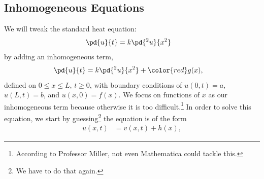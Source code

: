 \documentclass[10pt]{mypackage}
\begin{document}
\subsection{Inhomogeneous Equations}%
We will tweak the standard heat equation:
\begin{align*}
  \pd{u}{t} &= k\pd{^2u}{x^2}
\end{align*}
by adding an inhomogeneous term,
\begin{align*}
  \pd{u}{t} &= k\pd{^2u}{x^2} + {\color{red} g(x)},
\end{align*}
defined on $0 \leq x \leq L$, $t\geq 0$, with boundary conditions of $u\left( 0,t \right) = a$, $u\left( L,t \right) = b$, and $u\left( x,0 \right) = f(x)$. We focus on functions of $x$ as our inhomogeneous term because otherwise it is too difficult.\footnote{According to Professor Miller, not even Mathematica could tackle this.} In order to solve this equation, we start by guessing\footnote{We have to do that again.} the equation is of the form
\begin{align*}
  u\left( x,t \right) &= v\left( x,t \right) + h\left( x \right),
\end{align*}
\end{document}
